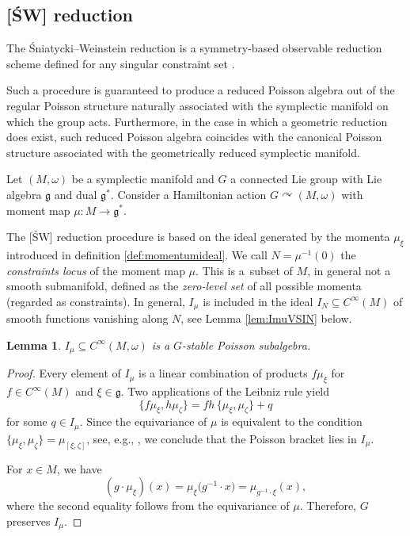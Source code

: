 \documentclass[10pt,a4paper]{amsart}
\numberwithin{equation}{section}
\newtheorem{Lemma}[Theorem]{Lemma}
\DeclareMathOperator{\action}{\curvearrowright}
\renewcommand{\subset}{\subseteq}
\begin{document}
\subsection{{[\'SW]} reduction}%

The \'Sniatycki--Weinstein reduction is a symmetry-based observable reduction scheme defined for any singular constraint set \cite{SniatyckiWeinstein83}.

Such a procedure is guaranteed to produce a reduced Poisson algebra out of the regular Poisson structure naturally associated with the symplectic manifold on which the group acts.
Furthermore, in the case in which a geometric reduction does exist, such reduced Poisson algebra coincides with the canonical Poisson structure associated with the geometrically reduced symplectic manifold.

Let $(M,\omega)$ be a symplectic manifold and $G$ a connected Lie group with Lie algebra $\mathfrak{g}$ and dual $\mathfrak{g}^*$.
Consider a Hamiltonian action $G\action (M,\omega)$ with moment map $\mu\colon M\to \mathfrak{g}^*$.

The [\'SW] reduction procedure is based on the ideal generated by the momenta $\mu_\xi$ introduced in definition \ref{def:momentumideal}.
	We call $N= \mu^{-1}(0)$ the \emph{constraints locus} of the moment map $\mu$.
	This is a~subset of $M$, in general not a smooth submanifold, defined as the \emph{zero-level set} of all possible momenta (regarded as constraints).
	In general, $I_\mu$ is included in the ideal $I_N\subset C^\infty(M)$ of smooth functions vanishing along $N$, see Lemma \ref{lem:ImuVSIN} below.


\begin{Lemma}\label{lem:ImuPoisson}
	$I_\mu\subset C^\infty(M,\omega)$ is a $G$-stable Poisson subalgebra.
\end{Lemma}

\begin{proof}
	Every element of $I_{\mu}$ is a linear combination of products $f \mu_\xi$ for $f \in C^\infty(M)$ and $\xi \in \mathfrak{g}$. Two applications of the Leibniz rule yield
	\[
		\{f \mu_\xi, h \mu_\zeta\} = fh\, \{ \mu_\xi,\mu_\zeta \} + q
	\]
	for some $q\in I_{\mu}$.
	Since the equivariance of $\mu$ is equivalent to the condition $\{\mu_\xi,\mu_\zeta\}=\mu_{[\xi,\zeta]}$, see, e.g., \cite[Section~22.1]{CannasdaSilva01}, we conclude that the Poisson bracket lies in $I_{\mu}$.

	For $x\in M$, we have
	\[
		( g \cdot \mu_\xi )(x) =
		\mu_\xi\bigl(g^{-1}\cdot x\bigr)
		= \mu_{g^{-1}\cdot\xi}(x),
	\]
	where the second equality follows from the equivariance of $\mu$.
	Therefore, $G$ preserves $I_{\mu}$.
\end{proof}
\end{document}
